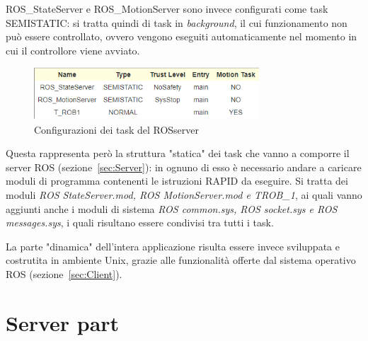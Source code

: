 ROS\_StateServer e ROS\_MotionServer sono invece configurati come task SEMISTATIC: si tratta quindi di task in \emph{background}, il cui funzionamento non può essere controllato, ovvero vengono eseguiti automaticamente nel momento in cui il controllore viene avviato.
\begin{figure}[h]
	\centering
	\includegraphics[width=0.75\textwidth]{Immagini/Task_Configuration}
	\caption{Configurazioni dei task del ROSserver}
	\label{fig:TaskConfiguration}
\end{figure}

Questa rappresenta però la struttura "statica" dei task che vanno a comporre il server ROS (sezione~\vref{sec:Server}): in ognuno di esso è necessario andare a caricare moduli di programma contenenti le istruzioni RAPID da eseguire. Si tratta dei moduli \emph{ROS StateServer.mod, ROS MotionServer.mod e TROB\_1}, ai quali vanno aggiunti anche i moduli di sistema \emph{ROS common.sys, ROS socket.sys e ROS messages.sys}, i quali risultano essere condivisi tra tutti i task. 

La parte "dinamica" dell'intera applicazione risulta essere invece sviluppata e costrutita in ambiente Unix, grazie alle funzionalità offerte dal sistema operativo ROS (sezione~\vref{sec:Client}).




\section{Server part}
\label{sec:Server}
